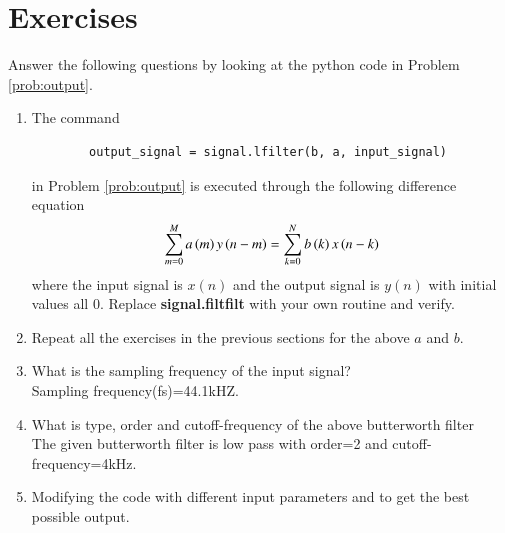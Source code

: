 \documentclass[journal,12pt,twocolumn]{IEEEtran}
\renewcommand\thesection{\arabic{section}}
\begin{document}
\section{Exercises}
Answer the following questions by looking at the python code in Problem \ref{prob:output}.
\begin{enumerate}[label=\thesection.\arabic*]
	\item
	The command
	\begin{lstlisting}
		output_signal = signal.lfilter(b, a, input_signal)
	\end{lstlisting}
	in Problem \ref{prob:output} is executed through the following difference equation
	\begin{equation}
		\label{eq:iir_filter_gen}
		\sum _{m=0}^{M}a\left(m\right)y\left(n-m\right)=\sum _{k=0}^{N}b\left(k\right)x\left(n-k\right)
	\end{equation}
	where the input signal is $x(n)$ and the output signal is $y(n)$ with initial values all 0. Replace
	\textbf{signal.filtfilt} with your own routine and verify.
	\item Repeat all the exercises in the previous sections for the above $a$ and $b$.
	
	\item What is the sampling frequency of the input signal?
	\\
	\solution
	Sampling frequency(fs)=44.1kHZ.
	\item
	What is type, order and  cutoff-frequency of the above butterworth filter
	\\
	\solution
	The given butterworth filter is low pass with order=2 and cutoff-frequency=4kHz.
	\item
	Modifying the code with different input parameters and to get the best possible output.
\end{enumerate}
\end{document}
